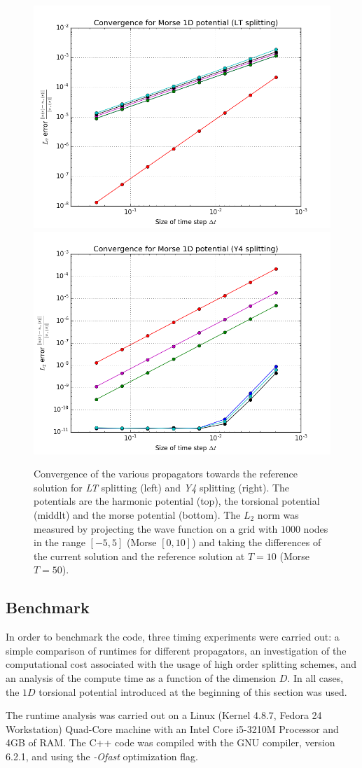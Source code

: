 \begin{figure}[ht]
	\includegraphics[width=.45\textwidth]{figures/convergence_morse_1D_lt.png}
	\includegraphics[width=.45\textwidth]{figures/convergence_morse_1D_y4.png}
	\caption{Convergence of the various propagators towards the reference solution for \emph{LT} splitting (left) and \emph{Y4} splitting (right). The potentials are the harmonic potential (top), the torsional potential (middlt) and the morse potential (bottom). The $L_2$ norm was measured by projecting the wave function on a grid with $1000$ nodes in the range $[-5,5]$ (Morse $[0,10]$) and taking the differences of the current solution and the reference solution at $T=10$ (Morse $T=50$).}
	\label{fig:error_analysis}
\end{figure}

\subsection{Benchmark}
\label{subsec:benchmark}
%
In order to benchmark the code, three timing experiments were carried out: a simple comparison of runtimes for different propagators, an investigation of the computational cost associated with the usage of high order splitting schemes, and an analysis of the compute time as a function of the dimension $D$.
In all cases, the $1D$ torsional potential introduced at the beginning of this section was used.
\par\medskip
%
The runtime analysis was carried out on a Linux (Kernel 4.8.7, Fedora 24 Workstation) Quad-Core machine with an Intel Core i5-3210M Processor and
4GB of RAM. The C++ code was compiled with the GNU compiler, version 6.2.1, and using the \emph{-Ofast} optimization flag.



